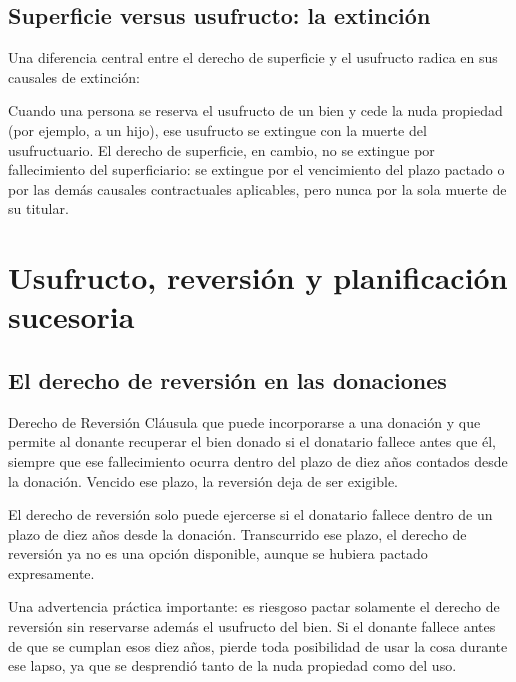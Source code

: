 \documentclass[12pt,oneside]{book}
\begin{document}
\section{Superficie versus usufructo: la extinción}

Una diferencia central entre el derecho de superficie y el usufructo radica en sus causales de extinción:

\begin{important}
Cuando una persona se reserva el usufructo de un bien y cede la nuda propiedad (por ejemplo, a un hijo), ese usufructo se extingue con la muerte del usufructuario. El derecho de superficie, en cambio, no se extingue por fallecimiento del superficiario: se extingue por el vencimiento del plazo pactado o por las demás causales contractuales aplicables, pero nunca por la sola muerte de su titular.
\end{important}


\chapter{Usufructo, reversión y planificación sucesoria}

\section{El derecho de reversión en las donaciones}

\begin{definition}{Derecho de Reversión}
Cláusula que puede incorporarse a una donación y que permite al donante recuperar el bien donado si el donatario fallece antes que él, siempre que ese fallecimiento ocurra dentro del plazo de diez años contados desde la donación. Vencido ese plazo, la reversión deja de ser exigible.
\end{definition}

\begin{important}
El derecho de reversión solo puede ejercerse si el donatario fallece dentro de un plazo de diez años desde la donación. Transcurrido ese plazo, el derecho de reversión ya no es una opción disponible, aunque se hubiera pactado expresamente.
\end{important}

Una advertencia práctica importante: es riesgoso pactar solamente el derecho de reversión sin reservarse además el usufructo del bien. Si el donante fallece antes de que se cumplan esos diez años, pierde toda posibilidad de usar la cosa durante ese lapso, ya que se desprendió tanto de la nuda propiedad como del uso.
\end{document}
